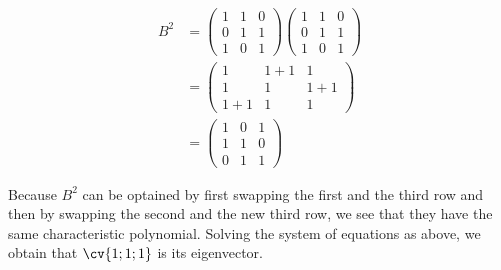 \documentclass[11pt]{scrartcl}
\begin{document}
\begin{soln}
\begin{align}
  B^2                       & = 
        \begin{pmatrix}
          1                 & 1   & 0   \\
          0                 & 1   & 1   \\
          1                 & 0   & 1
        \end{pmatrix}
                  \begin{pmatrix}
                    1       & 1   & 0   \\
                    0       & 1   & 1   \\
                    1       & 0   & 1
                  \end{pmatrix}         \\
                            & =
              \begin{pmatrix}
                1           & 1+1 & 1   \\
                1           & 1   & 1+1 \\
                1+1         & 1   & 1
              \end{pmatrix}             \\
                            & = 
                        \begin{pmatrix}
                          1 & 0   & 1   \\
                          1 & 1   & 0   \\
                          0 & 1   & 1
                        \end{pmatrix}
\end{align}

Because $B^2$ can be optained by first swapping the first and the third row and then by swapping the second and the new third row, we see that they have the same characteristic polynomial. Solving the system of equations as above, we obtain that $\cv{1;1;1}$ is its eigenvector.


\end{soln}
\end{document}
